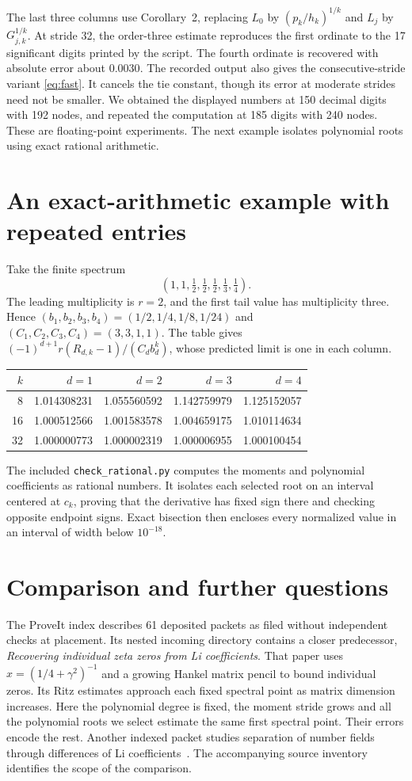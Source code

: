 \documentclass[11pt]{article}
\begin{document}
The last three columns use Corollary~2, replacing $L_0$ by
$(p_k/h_k)^{1/k}$ and $L_j$ by $G_{j,k}^{1/k}$. At stride 32, the
order-three estimate reproduces the first ordinate to the 17 significant
digits printed by the script. The fourth ordinate is recovered with absolute
error about $0.0030$. The recorded output also gives the consecutive-stride
variant \eqref{eq:fast}. It cancels the tie constant, though its error at
moderate strides need not be smaller. We obtained the displayed numbers at
150 decimal digits with 192 nodes, and repeated the computation at 185 digits
with 240 nodes. These are floating-point experiments. The next example
isolates polynomial roots using exact rational arithmetic.

\section{An exact-arithmetic example with repeated entries}
\label{sec:example}

Take the finite spectrum
\[
  (1,1,\tfrac12,\tfrac12,\tfrac12,\tfrac13,\tfrac14).
\]
The leading multiplicity is $r=2$, and the first tail value has multiplicity
three. Hence $(b_1,b_2,b_3,b_4)=(1/2,1/4,1/8,1/24)$ and
$(C_1,C_2,C_3,C_4)=(3,3,1,1)$. The table gives
$(-1)^{d+1}r(R_{d,k}-1)/(C_d b_d^k)$, whose predicted limit is one in
each column.
\begin{center}
\begin{tabular}{r|rrrr}
$k$ & $d=1$ & $d=2$ & $d=3$ & $d=4$ \\ \hline
 8 & 1.014308231 & 1.055560592 & 1.142759979 & 1.125152057 \\
16 & 1.000512566 & 1.001583578 & 1.004659175 & 1.010114634 \\
32 & 1.000000773 & 1.000002319 & 1.000006955 & 1.000100454
\end{tabular}
\end{center}
The included \texttt{check\_rational.py} computes the moments and polynomial
coefficients as rational numbers. It isolates each selected root on an interval
centered at $c_k$, proving that the derivative has fixed sign there and checking
opposite endpoint signs. Exact bisection then encloses every normalized value
in an interval of width below $10^{-18}$.


\section{Comparison and further questions}
The ProveIt index describes 61 deposited packets as filed without independent
checks at placement. Its nested incoming directory contains a closer
predecessor, \emph{Recovering individual zeta zeros from Li coefficients}.
That paper uses $x=(1/4+\gamma^2)^{-1}$ and a growing Hankel matrix pencil
to bound individual zeros. Its Ritz estimates approach each fixed spectral
point as matrix dimension increases. Here the polynomial degree is fixed,
the moment stride grows and all the polynomial roots we select estimate the
same first spectral point. Their errors encode the rest. Another indexed
packet studies separation of number fields through differences of Li
coefficients~\cite{proveit}. The accompanying source inventory identifies
the scope of the comparison.
\end{document}
